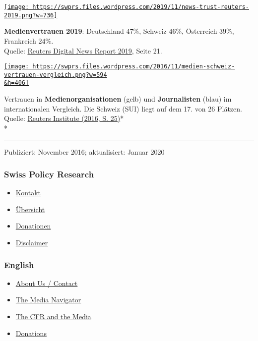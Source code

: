 \href{https://swprs.files.wordpress.com/2019/11/news-trust-reuters-2019.png}{\texttt{[image: https://swprs.files.wordpress.com/2019/11/news-trust-reuters-2019.png?w=736]}}

\textbf{Medienvertrauen 2019}: Deutschland 47\%, Schweiz 46\%,
Österreich 39\%, Frankreich 24\%.\\
Quelle:
\href{https://reutersinstitute.politics.ox.ac.uk/sites/default/files/2019-06/DNR_2019_FINAL_0.pdf}{Reuters
Digital News Report 2019}, Seite 21.

\href{https://swprs.files.wordpress.com/2016/11/medien-schweiz-vertrauen-vergleich.png}{\texttt{[image: https://swprs.files.wordpress.com/2016/11/medien-schweiz-vertrauen-vergleich.png?w=594\\\&h=406]}}

Vertrauen in \textbf{Medienorganisationen} (gelb) und
\textbf{Journalisten} (blau) im internationalen Vergleich. Die Schweiz
(SUI) liegt auf dem 17. von 26 Plätzen. Quelle:
\href{http://media.digitalnewsreport.org/wp-content/uploads/2018/11/Digital-News-Report-2016.pdf\#page=26}{Reuters
Institute (2016, S. 25)}*\\
*

\begin{center}\rule{0.5\linewidth}{\linethickness}\end{center}

Publiziert: November 2016; aktualisiert: Januar 2020

\hypertarget{swiss-policy-research}{%
\subsubsection{Swiss Policy Research}\label{swiss-policy-research}}

\begin{itemize}
\tightlist
\item
  \href{https://swprs.org/kontakt/}{Kontakt}
\item
  \href{https://swprs.org/uebersicht/}{Übersicht}
\item
  \href{https://swprs.org/donationen/}{Donationen}
\item
  \href{https://swprs.org/disclaimer/}{Disclaimer}
\end{itemize}

\hypertarget{english}{%
\subsubsection{English}\label{english}}

\begin{itemize}
\tightlist
\item
  \href{https://swprs.org/contact/}{About Us / Contact}
\item
  \href{https://swprs.org/media-navigator/}{The Media Navigator}
\item
  \href{https://swprs.org/the-american-empire-and-its-media/}{The CFR
  and the Media}
\item
  \href{https://swprs.org/donations/}{Donations}
\end{itemize}

